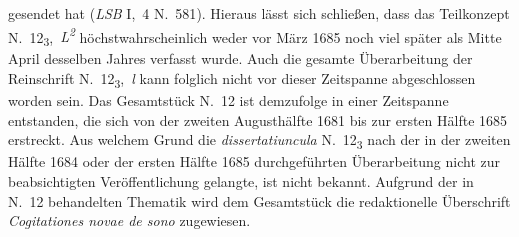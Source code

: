 gesendet hat (\textit{LSB} I,~4 N.~581\cite{01322}).
Hieraus lässt sich schließen, dass das Teilkonzept N.~12\textsubscript{3},~\textit{L\textsuperscript{2}} höchstwahrscheinlich weder vor März 1685 noch viel später als Mitte April desselben Jahres verfasst wurde.
Auch die gesamte Überarbeitung der Reinschrift N.~12\textsubscript{3},~\textit{l} %
kann folglich nicht vor dieser Zeitspanne abgeschlossen worden sein.
\pend
\newpage
\pstart
Das Gesamtstück N.~12 ist demzufolge in einer Zeitspanne entstanden, die sich von der zweiten Augusthälfte 1681 bis zur ersten Hälfte 1685 erstreckt.
Aus welchem Grund die \textit{dissertatiuncula} N.~12\textsubscript{3} %
nach der in der zweiten Hälfte 1684 oder der ersten Hälfte 1685 durchgeführten Überarbeitung nicht zur beabsichtigten Veröffentlichung %
gelangte, ist nicht bekannt.
Aufgrund der in N.~12 behandelten Thematik wird dem Gesamtstück die redaktionelle Überschrift \textit{Cogitationes novae de sono} zugewiesen.
\pend
\newpage %
\normalsize%